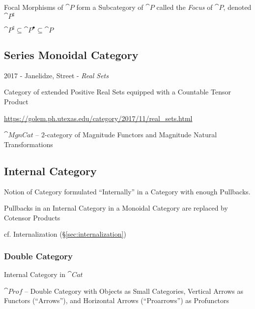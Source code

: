 Focal Morphisms of $\cat{P}$ form a Subcategory of $\cat{P}$ called
the \emph{Focus} of $\cat{P}$, denoted $\cat{P}^\sharp$

$\cat{P}^\sharp \subseteq \cat{P}^\bullet \subseteq \cat{P}$



\subsection{Series Monoidal Category}\label{sec:series_meonoidal_category}


2017 - Janelidze, Street - \emph{Real Sets}

Category of extended Positive Real Sets equipped with a Countable Tensor
Product

\url{https://golem.ph.utexas.edu/category/2017/11/real_sets.html}

$\cat{MgnCat}$ -- $2$-category of Magnitude Functors and Magnitude Natural
Transformations



\subsection{Internal Category}\label{sec:internal_category}


Notion of Category formulated ``Internally'' in a Category with enough
Pullbacks.

Pullbacks in an Internal Category in a Monoidal Category are replaced
by Cotensor Products

\fist cf. Internalization (\S\ref{sec:internalization})



\subsubsection{Double Category}\label{sec:double_category}

Internal Category in $\cat{Cat}$

$\cat{Prof}$ -- Double Category with Objects as Small Categories, Vertical
Arrows as Functors (``Arrows''), and Horizontal Arrows (``Proarrows'') as
Profunctors

